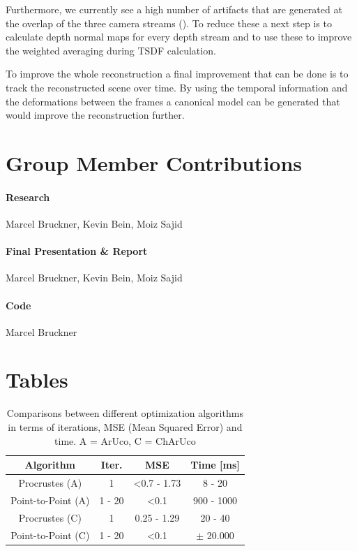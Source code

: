 \documentclass[10pt,twocolumn,letterpaper]{article}
\begin{document}
Furthermore, we currently see a high number of artifacts that are generated at the overlap of the three camera streams (). To reduce these a next step is to calculate depth normal maps for every depth stream and to use these to improve the weighted averaging during TSDF calculation.

To improve the whole reconstruction a final improvement that can be done is to track the reconstructed scene over time. By using the temporal information and the deformations between the frames a canonical model can be generated that would improve the reconstruction further.

\section{Group Member Contributions}
\paragraph{Research}
Marcel Bruckner, Kevin Bein, Moiz Sajid

\paragraph{Final Presentation \& Report}
Marcel Bruckner, Kevin Bein, Moiz Sajid

\paragraph{Code}
Marcel Bruckner

\newpage
\section{Tables}
\begin{table}[h!]
  \begin{center}
    \begin{tabular}{c|c|c|c}
      \textbf{Algorithm} & \textbf{Iter.} & \textbf{MSE} & \textbf{Time [ms]}\\
      \hline
      Procrustes (A)  & 1  & \textless 0.7 - 1.73 & 8 - 20\\
      Point-to-Point (A) & 1 - 20  & \textless 0.1 & 900 - 1000\\
      Procrustes (C) & 1  & 0.25 - 1.29 & 20 - 40\\
      Point-to-Point (C) & 1 - 20  & \textless 0.1 & $\pm$ 20.000\\
    \end{tabular}
     \caption{Comparisons between different optimization algorithms in terms of iterations, MSE (Mean Squared Error) and time. A = ArUco, C = ChArUco}
     \label{tab:camera-calibration}
  \end{center}
\end{table}
\end{document}
